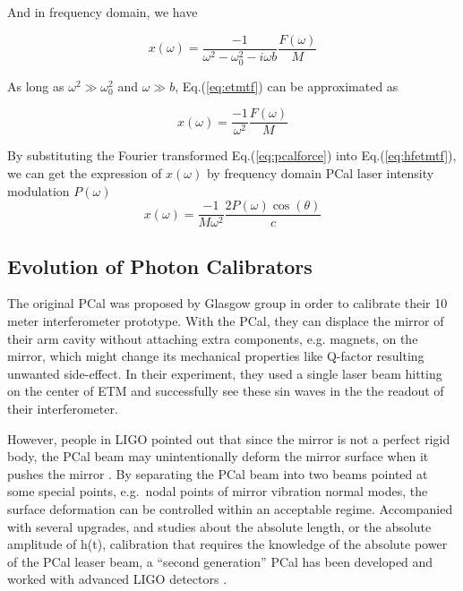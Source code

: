 And in frequency domain, we have

\begin{equation}
\label{eq:etmtf}
   x(\omega)=\frac{-1}{\omega^2 - \omega_0^2 - i \omega b} \frac{F(\omega)}{M}
\end{equation}

As long as $\omega^2 \gg \omega_0^2$ and $\omega \gg b$, Eq.(\ref{eq:etmtf}) can be approximated as

\begin{equation}
\label{eq:hfetmtf}
   x(\omega)=\frac{-1}{\omega^2}\frac{F(\omega)}{M}
\end{equation}

By substituting the Fourier transformed Eq.({\ref{eq:pcalforce}}) into Eq.({\ref{eq:hfetmtf}}), we can get the expression of $x(\omega)$ by frequency domain PCal laser intensity modulation $P(\omega)$
\begin{equation}
\label{eq:pcaldisp}
    x(\omega) = \frac{-1}{M \omega^2} \frac{2  P(\omega) \cos(\theta)}{c} 
\end{equation}



\subsection{Evolution of Photon Calibrators}


The original PCal was proposed by Glasgow group \cite{pcal:clubley2001} in order to calibrate their 10 meter interferometer prototype. With the PCal, they can displace the mirror of their arm cavity without attaching extra components, e.g. magnets, on the mirror, which might change its mechanical properties like Q-factor resulting unwanted side-effect. In their experiment, they used a single laser beam hitting on the center of ETM and successfully see these sin waves in the the readout of their interferometer. 

However, people in LIGO pointed out that since the mirror is not a perfect rigid body, the PCal beam may unintentionally deform the mirror surface when it pushes the mirror \cite{pcal:Daveloza2012}. By separating the PCal beam into two beams pointed at some special points, e.g.~nodal points of mirror vibration normal modes, the surface deformation can be controlled within an acceptable regime\cite{pcal:Daveloza2012}. Accompanied with several upgrades, and studies about the absolute length, or the absolute amplitude of h(t), calibration that requires the knowledge of the absolute power of the PCal leaser beam, a ``second generation'' PCal has been developed and worked with advanced LIGO detectors \cite{pcal:karki2016}.
 
